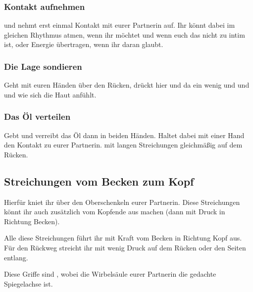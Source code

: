 \subsubsection{Kontakt aufnehmen}
 und nehmt erst einmal Kontakt mit eurer Partnerin auf. Ihr könnt dabei im gleichen Rhythmus atmen, wenn ihr möchtet und wenn euch das nicht zu intim ist, oder Energie übertragen, wenn ihr daran glaubt.

\subsubsection{Die Lage sondieren}
Geht mit euren Händen über den Rücken, drückt hier und da ein wenig und und  und wie sich die Haut anfühlt.

\subsubsection{Das Öl verteilen}

Gebt  und verreibt das Öl dann in beiden Händen. Haltet dabei mit einer Hand den Kontakt zu eurer Partnerin.  mit langen Streichungen gleichmäßig auf dem Rücken.


\subsection{Streichungen vom Becken zum Kopf}
Hierfür kniet ihr über den Oberschenkeln eurer Partnerin. Diese Streichungen könnt ihr auch zusätzlich vom Kopfende aus machen (dann mit Druck in Richtung Becken).

Alle diese Streichungen führt ihr mit Kraft vom Becken in Richtung Kopf aus. Für den Rückweg streicht ihr mit wenig Druck auf dem Rücken oder den Seiten entlang.

Diese Griffe sind , wobei die Wirbelsäule eurer Partnerin die gedachte Spiegelachse ist.

